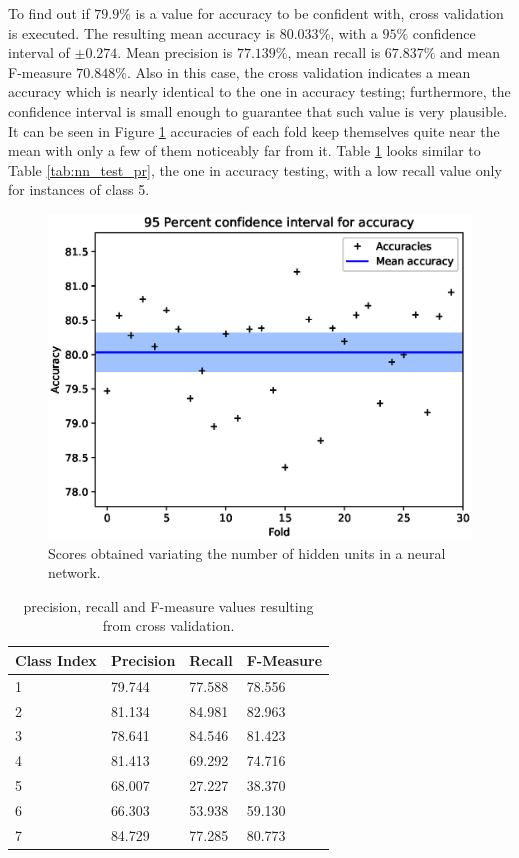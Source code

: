\documentclass[a4paper, 10pt]{article}
\begin{document}
To find out if $79.9\%$ is a value for accuracy to be confident with, cross validation is executed. The resulting mean accuracy is $80.033\%$, with a $95\%$ confidence interval of $\pm  0.274$. Mean precision is $77.139\%$, mean recall is $67.837\%$ and mean F-measure $70.848\%$. Also in this case, the cross validation indicates a mean accuracy which is nearly identical to the one in accuracy testing; furthermore, the confidence interval is small enough to guarantee that such value is very plausible. It can be seen in Figure \ref{fig:nn_accuracy_interval} accuracies of each fold keep themselves quite near the mean with only a few of them noticeably far from it. Table \ref{tab:nn_cross_pr} looks similar to Table \ref{tab:nn_test_pr}, the one in accuracy testing, with a low recall value only for instances of class 5.

\begin{figure}[H]
 \centering
 \includegraphics[width=0.8\linewidth]{pictures/nn_accuracy_interval.eps}
 \caption{Scores obtained variating the number of hidden units in a neural network.}
 \label{fig:nn_accuracy_interval}
\end{figure}

\begin{table}[H]
\centering
\begin{tabular}{|l|l|l|l|}
\hline
\textbf{Class Index} & \textbf{Precision} & \textbf{Recall} & \textbf{F-Measure}\\\hline
1 & 79.744 & 77.588& 78.556\\\hline
2 & 81.134 & 84.981& 82.963\\\hline
3 & 78.641 & 84.546& 81.423\\\hline
4 & 81.413 & 69.292& 74.716\\\hline
5 & 68.007 & 27.227& 38.370\\\hline
6 & 66.303 & 53.938& 59.130\\\hline
7 & 84.729 & 77.285& 80.773\\\hline
\end{tabular}
\caption{precision, recall and F-measure values resulting from cross validation.}
\label{tab:nn_cross_pr}
\end{table}
\end{document}
